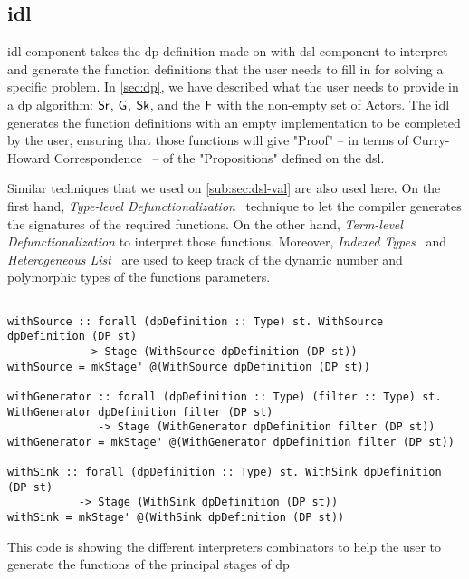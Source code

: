 \subsection{\acrfull{idl}}
\acrshort{idl} component takes the \acrshort{dp} definition made on with \acrshort{dsl} component to interpret and generate the function definitions
that the user needs to fill in for solving a specific problem. In \autoref{sec:dp}, we have described what the user needs to provide in a \acrshort{dp} algorithm: $\mathsf{Sr}$, $\mathsf{G}$, $\mathsf{Sk}$, and the $\mathsf{F}$ with the non-empty set of Actors.
The \acrshort{idl} generates the function definitions with an empty implementation to be completed by the user, ensuring that those functions will give "Proof" -- in terms of Curry-Howard Correspondence~\cite{curryhoward} --  of the "Propositions" defined on the \acrshort{dsl}.

Similar techniques that we used on \autoref{sub:sec:dsl-val} are also used here. 
On the first hand, \emph{Type-level Defunctionalization}~\cite{defunctionalization, fun-type-function-haskell} technique to let the compiler generates the signatures of the required functions. 
On the other hand, \emph{Term-level Defunctionalization} to interpret those functions.
Moreover, \emph{Indexed Types}~\cite{type-index} and \emph{Heterogeneous List}~\cite{hlist} are used to keep track of the dynamic number and polymorphic types of the functions parameters. 

\begin{listing}[htp!]
  \begin{verbatim}

withSource :: forall (dpDefinition :: Type) st. WithSource dpDefinition (DP st) 
            -> Stage (WithSource dpDefinition (DP st))
withSource = mkStage' @(WithSource dpDefinition (DP st))

withGenerator :: forall (dpDefinition :: Type) (filter :: Type) st. WithGenerator dpDefinition filter (DP st) 
              -> Stage (WithGenerator dpDefinition filter (DP st))
withGenerator = mkStage' @(WithGenerator dpDefinition filter (DP st))

withSink :: forall (dpDefinition :: Type) st. WithSink dpDefinition (DP st) 
           -> Stage (WithSink dpDefinition (DP st))
withSink = mkStage' @(WithSink dpDefinition (DP st))
  \end{verbatim}
  \caption[{[\texttt{Stage.hs}] Using with Interpreters of \acrshort{dp} encoded in $G_{dsl}$}]{This code is showing the different interpreters combinators to help the user to generate the functions of the principal stages of \acrshort{dp}}
  \label{src:dpfh:6}
\end{listing}

